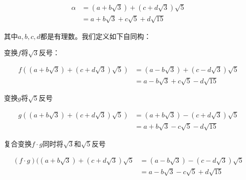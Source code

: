 \documentclass[b5paper]{ctexart}
\begin{document}
\[
\begin{array}{rl}
\alpha &= (a + b\sqrt{3}) + (c + d\sqrt{3}) \sqrt {5} \\
       &= a + b\sqrt{3} + c\sqrt{5} + d\sqrt{15}
\end{array}
\]

其中$a, b, c, d$都是有理数。我们定义如下自同构：

变换$f$将$\sqrt{3}$反号：

\[
\begin{array}{rl}
f((a + b\sqrt{3}) + (c + d\sqrt{3}) \sqrt {5}) & = (a - b\sqrt{3}) + (c - d\sqrt{3})\sqrt{5} \\
 & = a - b\sqrt{3} + c\sqrt{5} - d\sqrt{15}
\end{array}
\]

变换$g$将$\sqrt{5}$反号

\[
\begin{array}{rl}
g((a + b\sqrt{3}) + (c + d\sqrt{3}) \sqrt {5}) & = (a + b\sqrt{3}) - (c + d\sqrt{3})\sqrt{5} \\
 & = a + b\sqrt{3} - c\sqrt{5} - d\sqrt{15}
\end{array}
\]

复合变换$f \cdot g$同时将$\sqrt{3}$和$\sqrt{5}$反号

\[
\begin{array}{rl}
(f \cdot g)((a + b\sqrt{3}) + (c + d\sqrt{3}) \sqrt {5} & = (a - b\sqrt{3}) - (c - d\sqrt{3})\sqrt{5} \\
 & = a - b\sqrt{3} - c\sqrt{5} + d\sqrt{15}
\end{array}
\]
\end{document}
